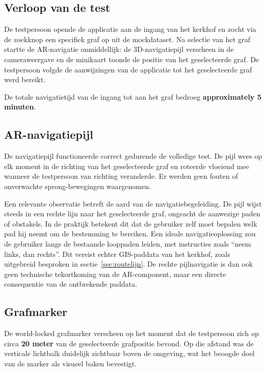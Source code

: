 \subsection{Verloop van de test}

De testpersoon opende de applicatie aan de ingang van het kerkhof en zocht via
de zoekknop een specifiek graf op uit de mockdataset. Na selectie van het graf
startte de AR-navigatie onmiddellijk: de 3D-navigatiepijl verscheen in de
cameraweergave en de minikaart toonde de positie van het geselecteerde graf.
De testpersoon volgde de aanwijzingen van de applicatie tot het geselecteerde
graf werd bereikt.

De totale navigatietijd van de ingang tot aan het graf bedroeg
\textbf{approximately 5 minuten}.

\subsection{AR-navigatiepijl}

De navigatiepijl functioneerde correct gedurende de volledige test. De pijl
wees op elk moment in de richting van het geselecteerde graf en roteerde vloeiend
mee wanneer de testpersoon van richting veranderde. Er werden geen fouten of
onverwachte sprong-bewegingen waargenomen.

Een relevante observatie betreft de aard van de navigatiebegeleiding. De pijl
wijst steeds in een rechte lijn naar het geselecteerde graf, ongeacht de
aanwezige paden of obstakels. In de praktijk betekent dit dat de gebruiker
zelf moet bepalen welk pad hij neemt om de bestemming te bereiken. Een ideale
navigatieoplossing zou de gebruiker langs de bestaande looppaden leiden, met
instructies zoals ``neem links, dan rechts''. Dit vereist echter GIS-paddata
van het kerkhof, zoals uitgebreid besproken in sectie~\ref{sec:routelijn}.
De rechte pijlnavigatie is dan ook geen technische tekortkoming van de
AR-component, maar een directe consequentie van de ontbrekende paddata.

\subsection{Grafmarker}

De world-locked grafmarker verscheen op het moment dat de testpersoon zich op
circa \textbf{20 meter} van de geselecteerde grafpositie bevond. Op die afstand
was de verticale lichtbalk duidelijk zichtbaar boven de omgeving, wat het
beoogde doel van de marker als visueel baken bevestigt.

